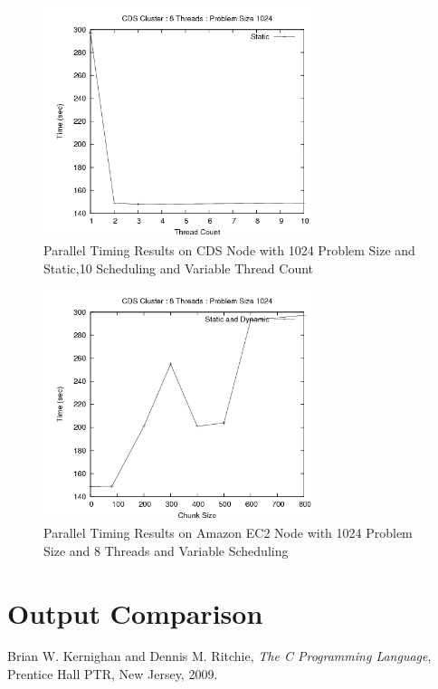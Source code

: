 \documentclass{article}
\begin{document}
\begin{figure}
\centering
\includegraphics[width=0.7\textwidth]{../data/cds_threads.png}
\caption{Parallel Timing Results on CDS Node with 1024 Problem Size and Static,10 Scheduling and Variable Thread Count}
\label{cds_threads}
\end{figure}

\begin{figure}
\centering
\includegraphics[width=0.7\textwidth]{../data/cds_block.png}
\caption{Parallel Timing Results on Amazon EC2 Node with 1024 Problem Size and 8 Threads and Variable Scheduling}
\label{cds_chunk}
\end{figure}




\section{Output Comparison}
\label{outputcomp}

\begin{thebibliography}{9}

  Brian W. Kernighan and Dennis M. Ritchie,
  \emph{The C Programming Language},
  Prentice Hall PTR, New Jersey,
  2009.

\end{thebibliography}
\end{document}

